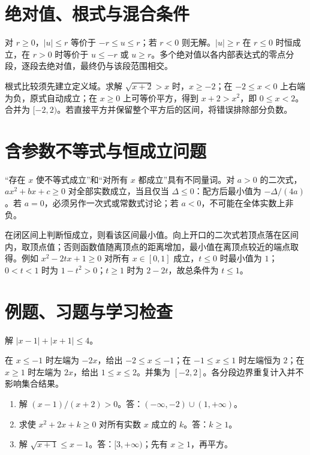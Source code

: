 \section{绝对值、根式与混合条件}
对 $r\ge0$，$|u|\le r$ 等价于 $-r\le u\le r$；若 $r<0$ 则无解。$|u|\ge r$ 在 $r\le0$ 时恒成立，在 $r>0$ 时等价于 $u\le-r$ 或 $u\ge r$。多个绝对值以各内部表达式的零点分段，逐段去绝对值，最终仍与该段范围相交。

根式比较须先建立定义域。求解 $\sqrt{x+2}>x$ 时，$x\ge-2$；在 $-2\le x<0$ 上右端为负，原式自动成立；在 $x\ge0$ 上可等价平方，得到 $x+2>x^2$，即 $0\le x<2$。合并为 $[-2,2)$。若直接平方并保留整个平方后的区间，将错误排除部分负数。

\section{含参数不等式与恒成立问题}
“存在 $x$ 使不等式成立”和“对所有 $x$ 都成立”具有不同量词。对 $a>0$ 的二次式，$ax^2+bx+c\ge0$ 对全部实数成立，当且仅当 $\Delta\le0$：配方后最小值为 $-\Delta/(4a)$。若 $a=0$，必须另作一次式或常数式讨论；若 $a<0$，不可能在全体实数上非负。

在闭区间上判断恒成立，则看该区间最小值。向上开口的二次式若顶点落在区间内，取顶点值；否则函数值随离顶点的距离增加，最小值在离顶点较近的端点取得。例如 $x^2-2tx+1\ge0$ 对所有 $x\in[0,1]$ 成立，$t\le0$ 时最小值为 $1$；$0<t<1$ 时为 $1-t^2>0$；$t\ge1$ 时为 $2-2t$，故总条件为 $t\le1$。

\section{例题、习题与学习检查}
\begin{example}
解 $|x-1|+|x+1|\le4$。
\end{example}
\begin{solve}
在 $x\le-1$ 时左端为 $-2x$，给出 $-2\le x\le-1$；在 $-1\le x\le1$ 时左端恒为 $2$；在 $x\ge1$ 时左端为 $2x$，给出 $1\le x\le2$。并集为 $[-2,2]$。各分段边界重复计入并不影响集合结果。
\end{solve}
\begin{enumerate}
\item 解 $(x-1)/(x+2)>0$。答：$(-\infty,-2)\cup(1,+\infty)$。
\item 求使 $x^2+2x+k\ge0$ 对所有实数 $x$ 成立的 $k$。答：$k\ge1$。
\item 解 $\sqrt{x+1}\le x-1$。答：$[3,+\infty)$；先有 $x\ge1$，再平方。
\end{enumerate}

